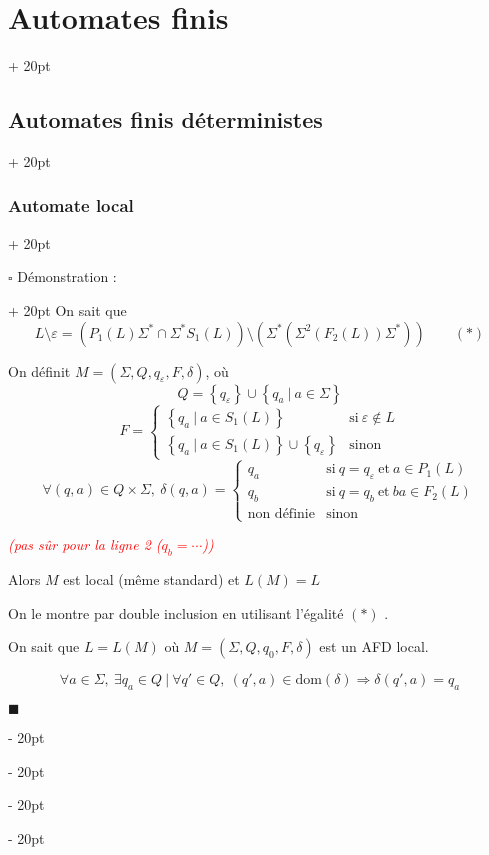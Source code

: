 \documentclass[a4paper, 12pt, twoside]{article}
\newcommand{\set}[1]{\left\{ #1 \right\}}
\newcommand{\ind}[1][20pt]{\advance\leftskip + #1}
\newcommand{\deind}[1][20pt]{\advance\leftskip - #1}
\newenvironment{indt}[2][20pt]{#2 \par \ind[#1]}{\par \deind} %
\newenvironment{proof}[1][{Démonstration :}]{\begin{indt}{$\square$ #1}}{$\blacksquare$ \end{indt}}
\begin{document}
\begin{indt}{\section{Automates finis}}
\begin{indt}{\subsection{Automates finis déterministes}}
\begin{indt}{\subsubsection{Automate local}}
                \vspace{6pt}
                
                \begin{proof}
                    \boxed{\Rightarrow} On sait que
                    \[
                        L \setminus \varepsilon = (P_1(L) \Sigma^* \cap \Sigma^*S_1(L)) \setminus (\Sigma^*(\Sigma^2 (F_2(L)) \Sigma^*))
                        \qquad (*)
                \]

                On définit $M = (\Sigma, Q, q_\varepsilon, F, \delta)$, où
                \[
                    Q = \set{q_\varepsilon} \cup \set{q_a\ |\ a \in \Sigma}
                \]
                \[
                    F =
                    \begin{cases}
                        \set{q_a\ |\ a \in S_1(L)}
                        & \text{si}\ \varepsilon \notin L
                        \\
                        \set{q_a\ |\ a \in S_1(L)} \cup \set{q_\varepsilon}
                        & \text{sinon}
                    \end{cases}
                \]
                \[
                    \forall (q ,a) \in Q \times \Sigma,\
                    \delta(q, a) =
                    \begin{cases}
                        q_a
                        & \text{si}\ q = q_\varepsilon\ \text{et}\ a \in P_1(L)
                        \\
                        q_b
                        & \text{si}\ q = q_b\ \text{et}\ ba \in F_2(L)
                        \\
                        \text{non définie}
                        & \text{sinon}
                    \end{cases}
                \]

                \textcolor{red}{\sl (pas sûr pour la ligne 2 ($q_b = \cdots$))}

                Alors $M$ est local (même standard) et $L(M) = L$

                On le montre par double inclusion en utilisant l'égalité $(*)$ .

                \vspace{12pt}
                
                \boxed{\Leftarrow} On sait que $L = L(M)$ où $M = (\Sigma, Q, q_0, F, \delta)$ est un AFD local.

                \[
                    \forall a \in \Sigma,\ \exists q_a \in Q\ |\ \forall q' \in Q,\
                    (q', a) \in \mathrm{dom}(\delta) \Rightarrow \delta(q', a) = q_a
                \]


\end{proof}
\end{indt}
\end{indt}
\end{indt}
\end{document}
